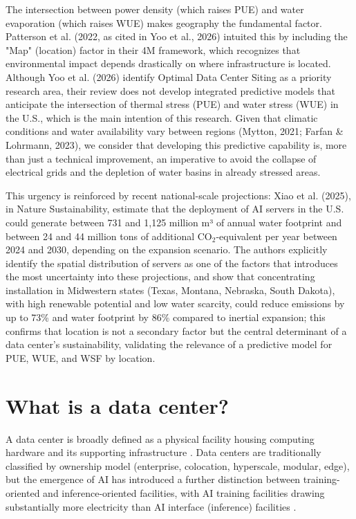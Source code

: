 \documentclass[conference]{IEEEtran}
\begin{document}
The intersection between power density (which raises PUE) and water evaporation (which raises WUE) makes geography the fundamental factor. Patterson et al. (2022, as cited in Yoo et al., 2026) intuited this by including the "Map" (location) factor in their 4M framework, which recognizes that environmental impact depends drastically on where infrastructure is located. Although Yoo et al. (2026) identify Optimal Data Center Siting as a priority research area, their review does not develop integrated predictive models that anticipate the intersection of thermal stress (PUE) and water stress (WUE) in the U.S., which is the main intention of this research. Given that climatic conditions and water availability vary between regions (Mytton, 2021; Farfan \& Lohrmann, 2023), we consider that developing this predictive capability is, more than just a technical improvement, an imperative to avoid the collapse of electrical grids and the depletion of water basins in already stressed areas.

This urgency is reinforced by recent national-scale projections: Xiao et al. (2025), in Nature Sustainability, estimate that the deployment of AI servers in the U.S. could generate between 731 and 1,125 million m³ of annual water footprint and between 24 and 44 million tons of additional CO$_2$-equivalent per year between 2024 and 2030, depending on the expansion scenario. The authors explicitly identify the spatial distribution of servers as one of the factors that introduces the most uncertainty into these projections, and show that concentrating installation in Midwestern states (Texas, Montana, Nebraska, South Dakota), with high renewable potential and low water scarcity, could reduce emissions by up to 73\% and water footprint by 86\% compared to inertial expansion; this confirms that location is not a secondary factor but the central determinant of a data center's sustainability, validating the relevance of a predictive model for PUE, WUE, and WSF by location.

\section{What is a data center?}

A data center is broadly defined as a physical facility housing computing hardware and its supporting infrastructure \cite{AWSDataCenter}. Data centers are traditionally classified by ownership model (enterprise, colocation, hyperscale, modular, edge), but the emergence of AI has introduced a further distinction between training-oriented and inference-oriented facilities, with AI training facilities drawing substantially more electricity than AI interface (inference) facilities \cite{Cruzes2026}.
\end{document}
